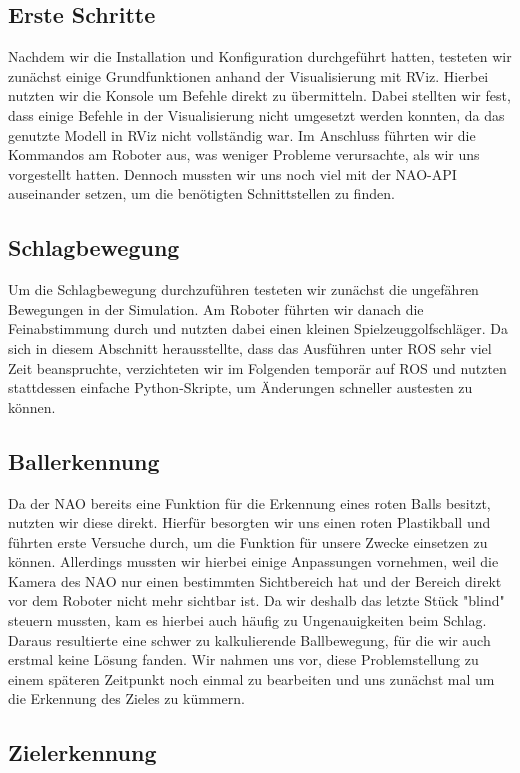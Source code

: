 \documentclass{scrartcl}
\begin{document}
\subsection{Erste Schritte}

Nachdem wir die Installation und Konfiguration durchgeführt hatten, testeten wir zunächst einige Grundfunktionen anhand der Visualisierung mit RViz.
Hierbei nutzten wir die Konsole um Befehle direkt zu übermitteln. Dabei stellten wir fest, dass einige Befehle in der Visualisierung nicht umgesetzt werden konnten, da das genutzte Modell in RViz nicht vollständig war.
Im Anschluss führten wir die Kommandos am Roboter aus, was weniger Probleme verursachte, als wir uns vorgestellt hatten. 
Dennoch mussten wir uns noch viel mit der NAO-API auseinander setzen, um die benötigten Schnittstellen zu finden.

\subsection{Schlagbewegung}

Um die Schlagbewegung durchzuführen testeten wir zunächst die ungefähren Bewegungen in der Simulation. Am Roboter führten wir danach die Feinabstimmung durch und nutzten dabei einen kleinen Spielzeuggolfschläger. 
Da sich in diesem Abschnitt herausstellte, dass das Ausführen unter ROS sehr viel Zeit beanspruchte, verzichteten wir im Folgenden temporär auf ROS und nutzten stattdessen einfache Python-Skripte, um Änderungen schneller austesten zu können.

\subsection{Ballerkennung}

Da der NAO bereits eine Funktion für die Erkennung eines roten Balls besitzt, nutzten wir diese direkt. Hierfür besorgten wir uns einen roten Plastikball und führten erste Versuche durch, um die Funktion für unsere Zwecke einsetzen zu können.
Allerdings mussten wir hierbei einige Anpassungen vornehmen, weil die Kamera des NAO nur einen bestimmten Sichtbereich hat und der Bereich direkt vor dem Roboter nicht mehr sichtbar ist. Da wir deshalb das letzte Stück "blind" steuern mussten, kam es hierbei auch häufig zu Ungenauigkeiten beim Schlag. Daraus resultierte eine schwer zu kalkulierende Ballbewegung, für die wir auch erstmal keine Lösung fanden. Wir nahmen uns vor, diese Problemstellung zu einem späteren Zeitpunkt noch einmal zu bearbeiten und uns zunächst mal um die Erkennung des Zieles zu kümmern.

\subsection{Zielerkennung}
\end{document}
